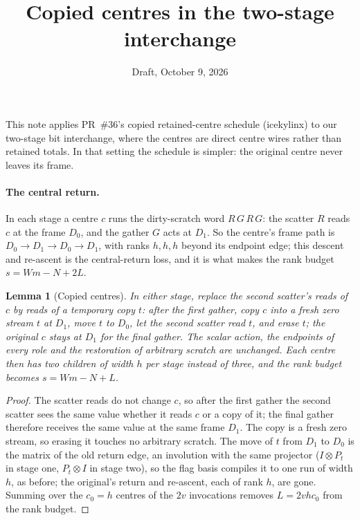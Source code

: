 \documentclass[11pt]{article}
\title{Copied centres in the two-stage interchange}
\date{Draft, October 9, 2026}
\newtheorem{lemma}{Lemma}
\theoremstyle{remark}\newtheorem*{remark}{Remark}
\begin{document}
\maketitle

This note applies PR~\#36's copied retained-centre schedule (icekylinx) to our two-stage bit interchange, where the
centres are direct centre wires rather than retained totals. In that setting the schedule is simpler: the original
centre never leaves its frame.

\paragraph{The central return.} In each stage a centre $c$ runs the dirty-scratch word $R\,G\,R\,G$: the scatter $R$
reads $c$ at the frame $D_0$, and the gather $G$ acts at $D_1$. So the centre's frame path is
$D_0\to D_1\to D_0\to D_1$, with ranks $h,h,h$ beyond its endpoint edge; this descent and re-ascent is the central-return
loss, and it is what makes the rank budget $s=Wm-N+2L$.

\begin{lemma}[Copied centres]\label{lem:copy}
In either stage, replace the second scatter's reads of $c$ by reads of a temporary copy $t$: after the first gather,
copy $c$ into a fresh zero stream $t$ at $D_1$, move $t$ to $D_0$, let the second scatter read $t$, and erase $t$; the
original $c$ stays at $D_1$ for the final gather. The scalar action, the endpoints of every role and the restoration of
arbitrary scratch are unchanged. Each centre then has two children of width $h$ per stage instead of three, and the rank
budget becomes $s=Wm-N+L$.
\end{lemma}
\begin{proof}
The scatter reads do not change $c$, so after the first gather the second scatter sees the same value whether it reads
$c$ or a copy of it; the final gather therefore receives the same value at the same frame $D_1$. The copy is a fresh
zero stream, so erasing it touches no arbitrary scratch. The move of $t$ from $D_1$ to $D_0$ is the matrix of the old
return edge, an involution with the same projector ($I\otimes P_t$ in stage one, $P_t\otimes I$ in stage two), so the
flag basis compiles it to one run of width $h$, as before; the original's return and re-ascent, each of rank $h$, are
gone. Summing over the $c_0=h$ centres of the $2v$ invocations removes $L=2vhc_0$ from the rank budget.
\end{proof}
\end{document}
